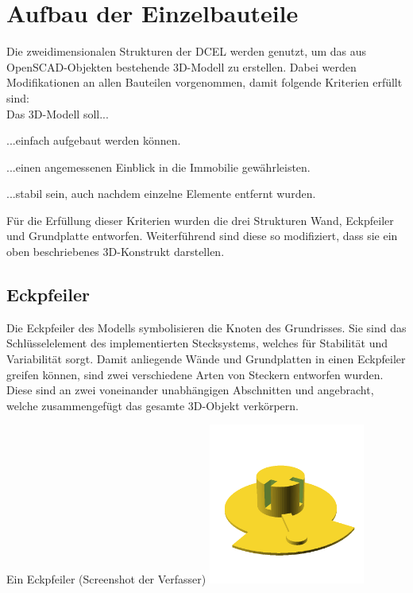 \section{Aufbau der Einzelbauteile}
Die zweidimensionalen Strukturen der DCEL werden genutzt, um das aus OpenSCAD-Objekten bestehende 3D-Modell zu erstellen.
Dabei werden Modifikationen an allen Bauteilen vorgenommen, damit folgende Kriterien erfüllt sind:\\
Das 3D-Modell soll...

\begin{compactenum}
	\item ...einfach aufgebaut werden können.
	\item ...einen angemessenen Einblick in die Immobilie gewährleisten.
	\item ...stabil sein, auch nachdem einzelne Elemente entfernt wurden.
\end{compactenum}

Für die Erfüllung dieser Kriterien wurden die drei Strukturen Wand, Eckpfeiler und Grundplatte entworfen.
Weiterführend sind diese so modifiziert, dass sie ein oben beschriebenes 3D-Konstrukt darstellen.

\subsection{Eckpfeiler}
Die Eckpfeiler des Modells symbolisieren die Knoten des Grundrisses.
Sie sind das Schlüsselelement des implementierten Stecksystems, welches für Stabilität und Variabilität sorgt.
Damit anliegende Wände und Grundplatten in einen Eckpfeiler greifen können, sind zwei verschiedene Arten von Steckern entworfen wurden.
Diese sind an zwei voneinander unabhängigen Abschnitten  und  angebracht, welche zusammengefügt das gesamte 3D-Objekt verkörpern.

\begin{Bild}{Ein Eckpfeiler (Screenshot der Verfasser)}
	\includegraphics[height=200px]{Bilder/Untereinheit_Ecke}
\end{Bild}

